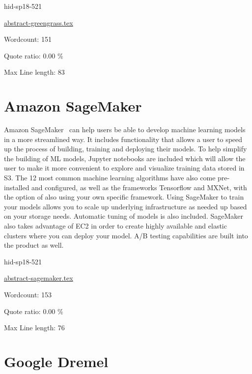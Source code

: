 \begin{IU}

hid-sp18-521

\href{https://github.com/cloudmesh-community/hid-sp18-521/blob/master//technology/abstract-greengrass.tex}{abstract-greengrass.tex}

 

Wordcount: 151


Quote ratio: 0.00 \%
 
Max Line length: 83
\end{IU}

\section{Amazon SageMaker}

Amazon SageMaker~\cite{hid-sp18-521-Sagemaker} can help users
be able to develop machine learning models in a more streamlined way. It
includes functionality that allows a user to speed up the process of
building, training and deploying their models. To help simplify the 
building of ML models, Jupyter notebooks are included which will allow 
the user to make it more convenient to explore and visualize training 
data stored in S3. The 12 most common machine learning algorithms have 
also come pre-installed and configured, as well as the frameworks Tensorflow
and MXNet, with the option of also using your own specific framework. 
Using SageMaker to train your models allows you to scale up underlying 
infrastructure as needed up based on your storage needs. Automatic tuning
of models is also included. SageMaker also takes advantage of EC2 in order
to create highly available and elastic clusters where you can deploy your
model. A/B testing capabilities are built into the product as well. 


\begin{IU}

hid-sp18-521

\href{https://github.com/cloudmesh-community/hid-sp18-521/blob/master//technology/abstract-sagemaker.tex}{abstract-sagemaker.tex}

 

Wordcount: 153


Quote ratio: 0.00 \%
 
Max Line length: 76
\end{IU}

\section{Google Dremel}


